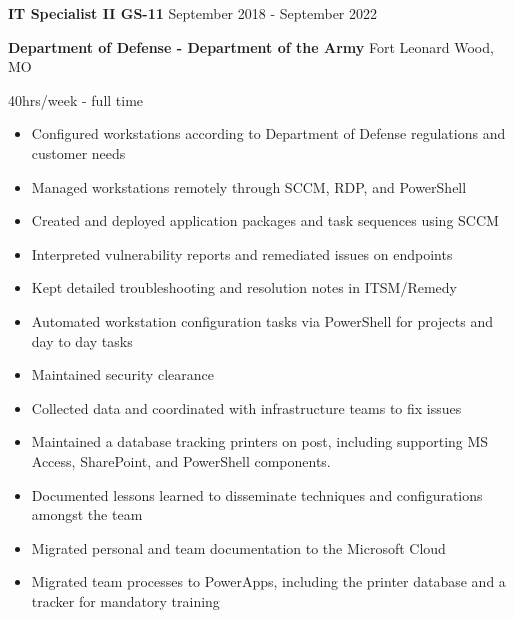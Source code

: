 \documentclass[../main.tex]{subfiles}
\begin{document}
    \textbf{IT Specialist II GS-11}
    \hfill
    September 2018 - September 2022
    
    \textbf{Department of Defense - Department of the Army}
    \hfill
    Fort Leonard Wood, MO
    
    \hfill
    40hrs/week - full time
    \begin{itemize}
        \item Configured workstations according to Department of Defense regulations and customer needs
        \item Managed workstations remotely through SCCM, RDP, and PowerShell
        \item Created and deployed application packages and task sequences using SCCM
        \item Interpreted vulnerability reports and remediated issues on endpoints
        \item Kept detailed troubleshooting and resolution notes in ITSM/Remedy
        \item Automated workstation configuration tasks via PowerShell for projects and day to day tasks
        \item Maintained security clearance
        \item Collected data and coordinated with infrastructure teams to fix issues
        \item Maintained a database tracking printers on post, including supporting MS Access, SharePoint, and PowerShell components.
        \item Documented lessons learned to disseminate techniques and configurations amongst the team
        \item Migrated personal and team documentation to the Microsoft Cloud
        \item Migrated team processes to PowerApps, including the printer database and a tracker for mandatory training
    \end{itemize}
\end{document}
